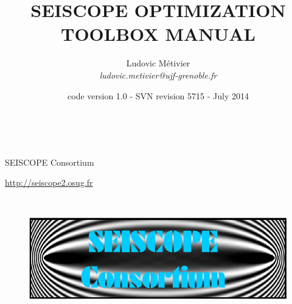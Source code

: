 \documentclass[a4paper,twoside,final,onecolumn,11pt,openright]{article}
\begin{document}
\title{SEISCOPE OPTIMIZATION TOOLBOX MANUAL}

\date{code version 1.0 - SVN revision 5715 - July 2014}

\author{{\Large{Ludovic M\'etivier}} \\
{\it{ludovic.metivier@ujf-grenoble.fr}}}

\maketitle

$\;$ \\[2 cm]
	
{\huge{\bf{\centerline{SEISCOPE Consortium}}}} 
{\large{\bf{\centerline{\url{http://seiscope2.osug.fr}}}}} 
	
$\;$ \\[1 cm]

\begin{figure}[ht!]
\begin{center}
\includegraphics[width=12 cm]{logo}
\end{center}
\label{figlogo}
\end{figure}

 \newpage
 \strut
 \newpage
\end{document}
